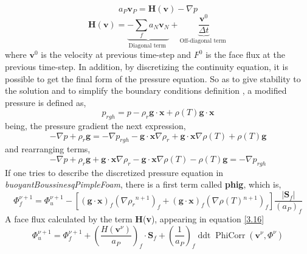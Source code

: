 \begin{equation}
a_{P} \textbf{v}_{P}=\textbf{H}(\textbf{v})-\nabla p
\label{3.15}
\end{equation}
\begin{equation}
\textbf{H}(\textbf{v})=\underbrace{-\sum_{f} a_{N} \textbf{v}_{N}}_{\text {Diagonal term }}+\underbrace{\frac{\textbf{v}^{0}}{\Delta t}}_{\text {Off-diagonal term }}
\label{3.16}
\end{equation}
where $\textbf{v}^{0}$ is the velocity at previous time-step and $F^{0}$ is the face flux at the previous time-step.
\newline
In addition, by discretizing the continuity equation, it is possible to get the final form of the pressure equation.
\newline
So as to give stability to the solution and to simplify the boundary conditions definition \cite{berberovic_van hinsberg_jakirlic_roisman_tropea_2009}, a modified pressure is defined as,
\begin{equation}
p_{r g h}=p-\rho_{r} \textbf{g} \cdot \textbf{x} + \rho(T) \textbf{g} \cdot \textbf{x}
\label{3.17}
\end{equation}
being, the pressure gradient the next expression,
\begin{equation}
-\nabla p+\rho_{r} \textbf{g}=-\nabla p_{r g h}-\textbf{g} \cdot \textbf{x} \nabla \rho_{r} + \textbf{g} \cdot \textbf{x} \nabla \rho(T) + \rho(T) \textbf{g}
\label{3.18}
\end{equation}
and rearranging terms, 
\begin{equation}
	-\nabla p+\rho_{r} \textbf{g} + \textbf{g} \cdot \textbf{x} \nabla \rho_{r} - \textbf{g} \cdot \textbf{x} \nabla \rho(T) - \rho(T) \textbf{g}=-\nabla p_{r g h}
	\label{3.19}
\end{equation}
If one tries to describe the discretized pressure equation in \textit{buoyantBoussinesqPimpleFoam}, there is a first term called \textbf{phig}, which is,
\begin{equation}
	\Phi_{f}^{\nu+1}=\Phi_{u}^{\nu+1} - \left[(\textbf{g} \cdot \textbf{x})_{f}\left(\nabla \rho_{r}{ }^{n+1}\right)_{f}+(\textbf{g} \cdot \textbf{x})_{f}\left(\nabla \rho(T){ }^{n+1}\right)_{f}\right]\frac{\left|\textbf{S}_{f}\right|}{\left(a_{P}\right)_{f}}
	\label{3.20}
\end{equation}
A face flux calculated by the term \textbf{H}(\textbf{v}), appearing in equation \ref{3.16}
\begin{equation}
\Phi_{u}^{\nu+1}=\Phi_{f}^{\nu+1} + \left(\frac{H\left(\textbf{v}^{\nu}\right)}{a_{P}}\right)_{f} \cdot \textbf{S}_{f}+\left(\frac{1}{a_{P}}\right)_{f}\operatorname{ddt} \operatorname{PhiCorr}\left(\textbf{v}^{\nu}, \Phi^{\nu}\right)
\label{3.21}
\end{equation}
